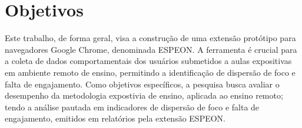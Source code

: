 \section{Objetivos}

Este trabalho, de forma geral, visa a construção de uma extensão protótipo para navegadores Google Chrome, denominada ESPEON. A ferramenta é crucial para a coleta de dados comportamentais dos usuários submetidos a aulas expositivas em ambiente remoto de ensino, permitindo a identificação de dispersão de foco e falta de engajamento. Como objetivos específicos, a pesquisa busca avaliar o desempenho da metodologia expostivia de ensino, aplicada ao ensino remoto; tendo a análise pautada em indicadores de dispersão de foco e falta de engajamento, emitidos em relatórios pela extensão ESPEON. 